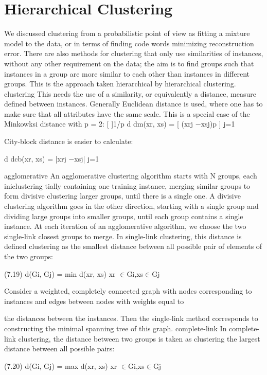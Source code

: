 \section{Hierarchical Clustering}

We discussed clustering from a probabilistic point of view as fitting a mixture model to the data, or in terms of finding code words minimizing reconstruction error. There are also methods for clustering that only use similarities of instances, without any other requirement on the data; the aim is to find groups such that instances in a group are more similar to each other than instances in different groups. This is the approach taken hierarchical by hierarchical clustering. clustering This needs the use of a similarity, or equivalently a distance, measure defined between instances. Generally Euclidean distance is used, where one has to make sure that all attributes have the same scale. This is a special case of the Minkowksi distance with p = 2: [ ]1/p d dm(xr, xs) = [ (xrj $-$xsj)p ] j=1

City-block distance is easier to calculate:

d dcb(xr, xs) = |xrj $-$xsj| j=1

agglomerative An agglomerative clustering algorithm starts with N groups, each iniclustering tially containing one training instance, merging similar groups to form divisive clustering larger groups, until there is a single one. A divisive clustering algorithm goes in the other direction, starting with a single group and dividing large groups into smaller groups, until each group contains a single instance. At each iteration of an agglomerative algorithm, we choose the two single-link closest groups to merge. In single-link clustering, this distance is defined clustering as the smallest distance between all possible pair of elements of the two groups:

(7.19) d(Gi, Gj) = min d(xr, xs) xr $\in$Gi,xs$\in$Gj

Consider a weighted, completely connected graph with nodes corresponding to instances and edges between nodes with weights equal to

the distances between the instances. Then the single-link method corresponds to constructing the minimal spanning tree of this graph. complete-link In complete-link clustering, the distance between two groups is taken as clustering the largest distance between all possible pairs:

(7.20) d(Gi, Gj) = max d(xr, xs) xr $\in$Gi,xs$\in$Gj

